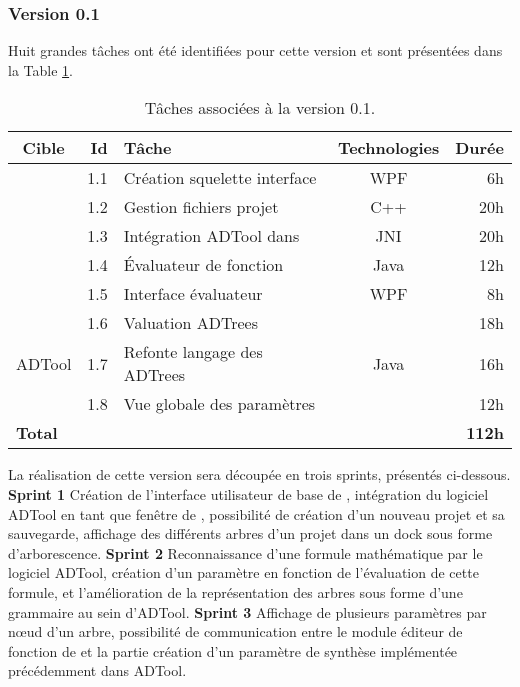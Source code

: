 	\subsubsection{Version 0.1}
		Huit grandes tâches ont été identifiées pour cette version et sont présentées dans la {\sc Table} \ref{tab:taches_units_1}. 
		\begin{table}[H]
			\centering
			\begin{tabular}{|c|r|l|c|r|}
				\hline
				\textbf{Cible} & \textbf{Id} & \textbf{Tâche} & \textbf{Technologies} & \textbf{Durée}\\
				\hline

				\multirow{5}{*}{\glasir{}} & 1.1 & Création squelette interface & WPF & 6h\\
				\cline{2-5}
				 & 1.2 & Gestion fichiers projet & C++ & 20h\\
				\cline{2-5}
				 & 1.3 & Intégration ADTool dans \glasir & JNI & 20h\\
				\cline{2-5}
				 & 1.4 & \'Evaluateur de fonction & Java & 12h\\
				\cline{2-5}
				 & 1.5 & Interface évaluateur & WPF & 8h\\
				\hline

				\multirow{3}{*}{ADTool} & 1.6 & Valuation ADTrees & \multirow{3}{*}{Java} & 18h\\
				\cline{2-3} \cline{5-5}
				 & 1.7 & Refonte langage des ADTrees & & 16h\\
				\cline{2-3} \cline{5-5}
				 & 1.8 & Vue globale des paramètres & & 12h\\
				\hline

				\multicolumn{4}{|l|}{\bf Total} & {\bf 112h}\\
				\hline
			\end{tabular}
			\caption{Tâches associées à la version 0.1.}
			\label{tab:taches_units_1}
		\end{table}
		
		
		La réalisation de cette version sera découpée en trois sprints, présentés ci-dessous.\newline
		\textbf{Sprint 1} Création de l'interface utilisateur de base de \glasir{}, intégration du logiciel ADTool en tant que fenêtre de \glasir{}, possibilité de création d'un nouveau projet et sa sauvegarde, affichage des différents arbres d'un projet dans un dock sous forme d'arborescence.\newline
		\textbf{Sprint 2} Reconnaissance d'une formule mathématique par le logiciel ADTool, création d'un paramètre en fonction de l'évaluation de cette formule, et l'amélioration de la représentation des arbres sous forme d'une grammaire au sein d'ADTool.\newline
		\textbf{Sprint 3} Affichage de plusieurs paramètres par nœud d'un arbre, possibilité de communication entre le module éditeur de fonction de \glasir{} et la partie création d'un paramètre de synthèse implémentée précédemment dans ADTool.\newline


